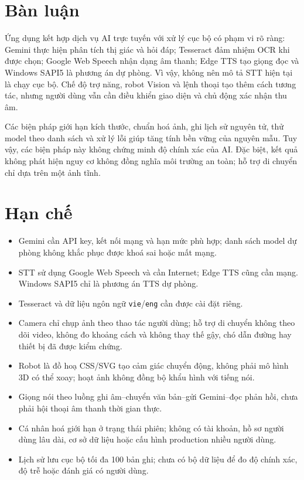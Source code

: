 \section{Bàn luận}

Ứng dụng kết hợp dịch vụ AI trực tuyến với xử lý cục bộ có phạm vi rõ ràng:
Gemini thực hiện phân tích thị giác và hỏi đáp; Tesseract đảm nhiệm OCR khi
được chọn; Google Web Speech nhận dạng âm thanh; Edge TTS tạo giọng đọc và
Windows SAPI5 là phương án dự phòng. Vì vậy, không nên mô tả STT hiện tại là
chạy cục bộ. Chế độ trợ năng, robot Vision và lệnh thoại tạo thêm cách tương
tác, nhưng người dùng vẫn cần điều khiển giao diện và chủ động xác nhận thu âm.

Các biện pháp giới hạn kích thước, chuẩn hoá ảnh, ghi lịch sử nguyên tử,
thử model theo danh sách và xử lý lỗi giúp tăng tính bền vững của nguyên mẫu.
Tuy vậy, các biện pháp này không chứng minh độ chính xác của AI. Đặc biệt,
kết quả không phát hiện nguy cơ không đồng nghĩa môi trường an toàn; hỗ trợ
di chuyển chỉ dựa trên một ảnh tĩnh.

\section{Hạn chế}

\begin{itemize}[leftmargin=1.6em, itemsep=2pt]
  \item Gemini cần API key, kết nối mạng và hạn mức phù hợp; danh sách model dự phòng không khắc phục được khoá sai hoặc mất mạng.
  \item STT sử dụng Google Web Speech và cần Internet; Edge TTS cũng cần mạng. Windows SAPI5 chỉ là phương án TTS dự phòng.
  \item Tesseract và dữ liệu ngôn ngữ \texttt{vie}/\texttt{eng} cần được cài đặt riêng.
  \item Camera chỉ chụp ảnh theo thao tác người dùng; hỗ trợ di chuyển không theo dõi video, không đo khoảng cách và không thay thế gậy, chó dẫn đường hay thiết bị đã được kiểm chứng.
  \item Robot là đồ hoạ CSS/SVG tạo cảm giác chuyển động, không phải mô hình 3D có thể xoay; hoạt ảnh không đồng bộ khẩu hình với tiếng nói.
  \item Giọng nói theo luồng ghi âm--chuyển văn bản--gửi Gemini--đọc phản hồi, chưa phải hội thoại âm thanh thời gian thực.
  \item Cá nhân hoá giới hạn ở trạng thái phiên; không có tài khoản, hồ sơ người dùng lâu dài, cơ sở dữ liệu hoặc cấu hình production nhiều người dùng.
  \item Lịch sử lưu cục bộ tối đa 100 bản ghi; chưa có bộ dữ liệu để đo độ chính xác, độ trễ hoặc đánh giá có người dùng.
\end{itemize}

